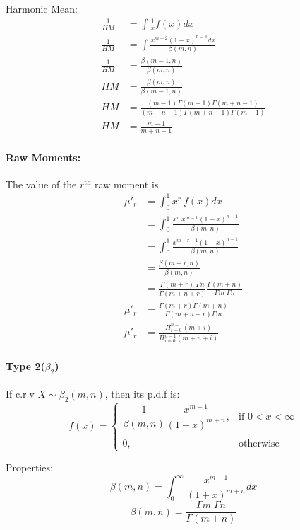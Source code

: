 \documentclass[
10pt, %
a4paper, %
]{report}
\begin{document}
Harmonic Mean:
\begin{align*}
    \frac{1}{HM} &= \int \frac{1}{x} f(x) dx \\
    \frac{1}{HM} &= \int \frac{x^{m-2}(1-x)^{n-1}dx}{\beta(m, n)} \\
    \frac{1}{HM} &= \frac{\beta(m-1, n)}{\beta(m, n)} \\
             HM  &= \frac{\beta(m, n)}{\beta(m-1, n)} \\
             HM  &= \frac{(m-1)\Gamma(m-1)\Gamma(m+n-1)}{(m+n-1)\Gamma(m+n-1) \Gamma(m-1)} \\
    HM &= \frac{m-1}{m+n-1}
\end{align*}
    

\paragraph{Raw Moments:}
The value of the \(r^{\text{th}}\) raw moment is
\begin{align*}
    \mu'_r &= \int_0^1 x^r\:f(x)dx \\
           &= \int_0^1 \frac{x^r\;x^{m-1}(1-x)^{n-1}}{\beta(m, n)} \\
           &= \int_0^1 \frac{x^{m+r-1}(1-x)^{n-1}}{\beta(m, n)} \\
           &= \frac{\beta(m+r, n)}{\beta(m, n)} \\
           &= \frac{\Gamma (m+r) \; \Gamma n}{\Gamma (m+n+r)} \frac{\Gamma (m+n)}{\Gamma m \; \Gamma n} \\
    \mu'_r &= \frac{\Gamma (m+r) \Gamma (m+n)}{\Gamma (m+n+r) \Gamma m} \\
    \mu'_r &= \frac{\Pi_{i=0}^{n-1}(m+i)}{\Pi_{i=0}^{n-1}(m+n+i)}
\end{align*}

\newpage
\paragraph*{Type 2(\(\beta_2\))}
If c.r.v \(X\sim \beta_2(m, n)\), then its p.d.f is:
\[
    f(x)= 
\begin{cases}
    \dfrac{1}{\beta(m, n)}\dfrac{x^{m-1}}{(1+x)^{m+n}}, & \text{if } 0 < x < \infty\\ \\
    0,                                     & \text{otherwise}
\end{cases}
\]

Properties:
\[
\beta(m, n) = \int_0^\infty \dfrac{x^{m-1}}{(1+x)^{m+n}} dx
\]
\[
\beta(m, n) = \frac{\Gamma m \; \Gamma n}{\Gamma (m+n)}
\]
\end{document}

